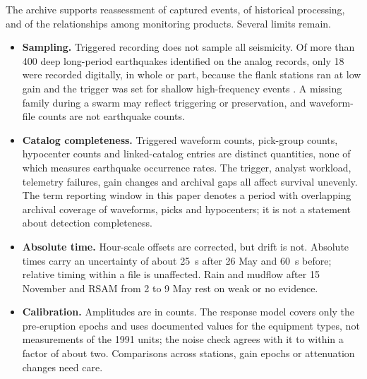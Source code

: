 \documentclass[linenum]{SSA-SRL}
\begin{document}
The archive supports reassessment of captured events, of historical processing, and of the relationships among monitoring products. Several limits remain.
\begin{itemize}
\item \textbf{Sampling.} Triggered recording does not sample all seismicity. Of more than 400 deep long-period earthquakes identified on the analog records, only 18 were recorded digitally, in whole or part, because the flank stations ran at low gain and the trigger was set for shallow high-frequency events \citep{White_1996}. A missing family during a swarm may reflect triggering or preservation, and waveform-file counts are not earthquake counts.
\item \textbf{Catalog completeness.} Triggered waveform counts, pick-group counts, hypocenter counts and linked-catalog entries are distinct quantities, none of which measures earthquake occurrence rates. The trigger, analyst workload, telemetry failures, gain changes and archival gaps all affect survival unevenly. The term reporting window in this paper denotes a period with overlapping archival coverage of waveforms, picks and hypocenters; it is not a statement about detection completeness.
\item \textbf{Absolute time.} Hour-scale offsets are corrected, but drift is not. Absolute times carry an uncertainty of about 25~s after 26 May and 60~s before; relative timing within a file is unaffected. Rain and mudflow after 15 November and RSAM from 2 to 9 May rest on weak or no evidence.
\item \textbf{Calibration.} Amplitudes are in counts. The response model covers only the pre-eruption epochs and uses documented values for the equipment types, not measurements of the 1991 units; the noise check agrees with it to within a factor of about two. Comparisons across stations, gain epochs or attenuation changes need care.

\end{itemize}
\end{document}
